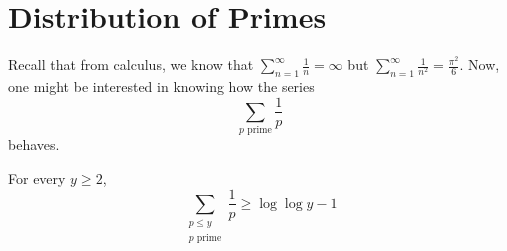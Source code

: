 



\section{Distribution of Primes}

Recall that from calculus, we know that
$
\sum_{n=1}^{\infty} \frac{1}{n} = \infty
$
but
$
\sum_{n=1}^{\infty} \frac{1}{n^2} = \frac{\pi^2}{6}.
$
Now, one might be interested in knowing how the series
$$
\sum_{\text{$p$ prime}} \frac{1}{p}
$$
behaves.

\begin{theorem}
    For every $y \geq 2$,
    $$
    \sum_{\substack{p \leq y \\ \text{$p$ prime}}} \frac{1}{p} \geq \log \log y - 1
    $$
\end{theorem}


